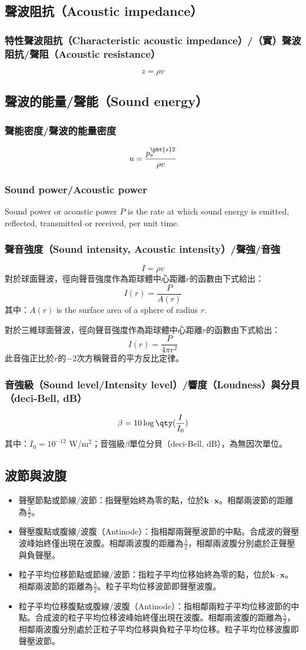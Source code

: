 \documentclass[a4paper,12pt]{report}
\begin{document}
\subsection{聲波阻抗（Acoustic impedance）}
\subsubsection{特性聲波阻抗（Characteristic acoustic impedance）/（實）聲波阻抗/聲阻（Acoustic resistance）}
\[z=\rho v\]
\subsection{聲波的能量/聲能（Sound energy）}
\subsubsection{聲能密度/聲波的能量密度}
\[ u = \frac{p_s^{\pht{s}2}}{\rho v}\]
\subsubsection{Sound power/Acoustic power}
Sound power or acoustic power $P$ is the rate at which sound energy is emitted, reflected, transmitted or received, per unit time.
\subsubsection{聲音強度（Sound intensity, Acoustic intensity）/聲強/音強}
\[ I = \rho v\]
對於球面聲波，徑向聲音強度作為距球體中心距離$r$的函數由下式給出：
\[I(r)=\frac{P}{A(r)}\]
其中：$A(r)$ is the surface area of a sphere of radius $r$.

對於三維球面聲波，徑向聲音強度作為距球體中心距離$r$的函數由下式給出：
\[I(r)=\frac{P}{4\pi r^{2}}\]
此音強正比於$r$的$-2$次方稱聲音的平方反比定律。
\subsubsection{音強級（Sound level/Intensity level）/響度（Loudness）與分貝（deci-Bell, dB）}
\[\beta = 10\log\qty(\frac{I}{I_0})\]
其中：$I_0=10^{-12}$ W/m$^2$；音強級$\beta$單位分貝（deci-Bell, dB），為無因次單位。
\subsection{波節與波腹}
\begin{itemize}
\item 聲壓節點或節線/波節：指聲壓始終為零的點，位於$\mathbf{k}\cdot\mathbf{x}$。相鄰兩波節的距離為$\frac{\lambda}{2}$。
\item 聲壓腹點或腹線/波腹（Antinode）：指相鄰兩聲壓波節的中點。合成波的聲壓波峰始終僅出現在波腹。相鄰兩波腹的距離為$\frac{\lambda}{2}$，相鄰兩波腹分別處於正聲壓與負聲壓。
\item 粒子平均位移節點或節線/波節：指粒子平均位移始終為零的點，位於$\mathbf{k}\cdot\mathbf{x}$。相鄰兩波節的距離為$\frac{\lambda}{2}$。粒子平均位移波節即聲壓波腹。
\item 粒子平均位移腹點或腹線/波腹（Antinode）：指相鄰兩粒子平均位移波節的中點。合成波的粒子平均位移波峰始終僅出現在波腹。相鄰兩波腹的距離為$\frac{\lambda}{2}$，相鄰兩波腹分別處於正粒子平均位移與負粒子平均位移。粒子平均位移波腹即聲壓波節。
\end{itemize}
\end{document}
